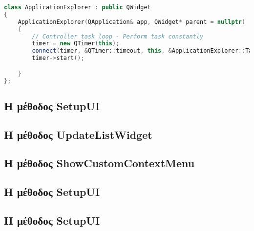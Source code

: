 \begin{lstlisting}[language=C++, style=cppstyle]
class ApplicationExplorer : public QWidget
{
    ApplicationExplorer(QApplication& app, QWidget* parent = nullptr) : QWidget(parent), app(app)
    {
        // Controller task loop - Perform task constantly
        timer = new QTimer(this);
        connect(timer, &QTimer::timeout, this, &ApplicationExplorer::TaskGamepadNavigation);
        timer->start();

    }
};
\end{lstlisting}



\subsection{Η μέθοδος SetupUI}
\subsection{Η μέθοδος UpdateListWidget}
\subsection{Η μέθοδος ShowCustomContextMenu}
\subsection{Η μέθοδος SetupUI}
\subsection{Η μέθοδος SetupUI}



\begin{lstlisting}[language=C++, style=cppstyle]
\end{lstlisting}